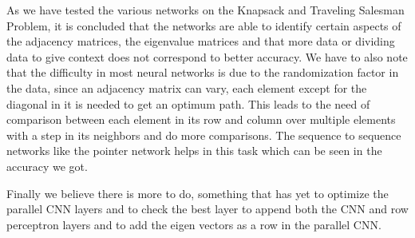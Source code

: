 \documentclass{iitthesis}
\begin{document}
As we have tested the various networks on the Knapsack and Traveling Salesman Problem, it is concluded that the networks are able to identify certain aspects of the adjacency matrices, the eigenvalue matrices and that more data or dividing data to give context does not correspond to better accuracy. We have to also note that the difficulty in most neural networks is due to the randomization factor in the data, since an adjacency matrix can vary, each element except for the diagonal in it is needed to get an optimum path. This leads to the need of comparison between each element in its row and column over multiple elements with a step in its neighbors and do more comparisons. The sequence to sequence networks like the pointer network helps in this task which can be seen in the accuracy we got. 

Finally we believe there is more to do, something that has yet to optimize the parallel CNN layers and to check the best layer to append both the CNN and row perceptron layers and to add the eigen vectors as a row in the parallel CNN. 












\end{document}
